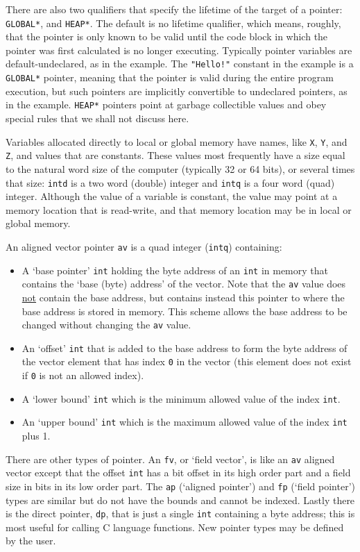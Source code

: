 \documentclass[12pt]{article}
\begin{document}
There are also two qualifiers that specify the lifetime of the target
of a pointer: {\tt *GLOBAL*}, and {\tt *HEAP*}.  The
default is no lifetime qualifier,
which means, roughly, that the pointer is only known to be valid until
the code block in which the pointer was first calculated is no
longer executing.  Typically pointer variables are default-undeclared,
as in the example.  The {\tt "Hello!"} constant in the example is
a {\tt *GLOBAL*} pointer, meaning that the pointer is valid during the
entire program execution, but such pointers are implicitly convertible
to undeclared pointers, as in the example.  {\tt *HEAP*} pointers
point at garbage collectible values and obey special rules that we
shall not discuss here.

Variables allocated directly to local or global memory
have names, like {\tt X}, {\tt Y}, and {\tt Z}, and values
that are constants.
These values most frequently
have a size equal to the natural
word size of the computer (typically 32 or 64 bits), or
several times that size: {\tt intd} is a two word (double) integer
and {\tt intq} is a four word (quad) integer.
Although the value of a variable is constant, the value may point
at a memory location that is read-write, and that memory location
may be in local or global memory.

An aligned vector pointer {\tt av} is a
quad integer ({\tt intq}) containing:
\begin{itemize}
\item A `base pointer' {\tt int} holding the byte address
of an {\tt int} in memory
that contains the `base (byte) address' of the vector.
Note that the {\tt av} value does \underline{not} contain
the base address, but contains instead this pointer to where
the base address is stored in memory.  This scheme allows
the base address to be changed without changing the {\tt av} value.
\item An `offset' {\tt int} that is added to the base address
to form the byte address of the vector element
that has index {\tt 0} in the vector (this element does not
exist if {\tt 0} is not an allowed index).
\item A `lower bound' {\tt int} which is the minimum allowed
value of the index {\tt int}.
\item An `upper bound' {\tt int} which is the maximum allowed
value of the index {\tt int} plus 1.
\end{itemize}

There are other types of pointer.  An {\tt fv}, or `field vector',
is like an {\tt av} aligned
vector except that the offset {\tt int} has a bit offset in its
high order part and a field size in bits in its low order part.
The {\tt ap} (`aligned pointer') and {\tt fp} (`field pointer')  types are
similar but do not have the bounds and cannot be indexed.  Lastly
there is the direct pointer, {\tt dp}, that is just a single {\tt int}
containing a byte address; this is most useful for calling
C language functions.
New pointer types may be defined by the user.
\end{document}
